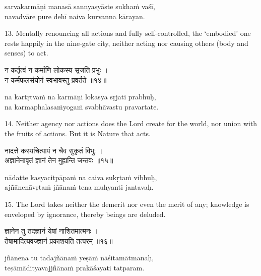 \begin{transliteration}
sarvakarmāṇi manasā sannyasyāste sukhaṁ vaśī, \\
navadvāre pure dehī naiva kurvanna kārayan.
\end{transliteration}

13. Mentally renouncing all actions and fully self-controlled, the `embodied'
one rests happily in the nine-gate city, neither acting nor causing others
(body and senses) to act.

\begin{gitaverse}
न कर्तृत्वं न कर्माणि लोकस्य सृजति प्रभुः । \\
न कर्मफलसंयोगं स्वभावस्तु प्रवर्तते ॥१४॥
\end{gitaverse}

\begin{transliteration}
na kartṛtvaṁ na karmāṇi lokasya sṛjati prabhuḥ, \\
na karmaphalasaṁyogaṁ svabhāvastu pravartate.
\end{transliteration}

14. Neither agency nor actions does the Lord create for the world, nor union
with the fruits of actions. But it is Nature that acts.

\begin{gitaverse}
नादत्ते कस्यचित्पापं न चैव सुकृतं विभुः । \\
अज्ञानेनावृतं ज्ञानं तेन मुह्यन्ति जन्तवः ॥१५॥
\end{gitaverse}

\begin{transliteration}
nādatte kasyacitpāpaṁ na caiva sukṛtaṁ vibhuḥ, \\
ajñānenāvṛtaṁ jñānaṁ tena muhyanti jantavaḥ.
\end{transliteration}

15. The Lord takes neither the demerit nor even the merit of any; knowledge is
enveloped by ignorance, thereby beings are deluded.

\begin{gitaverse}
ज्ञानेन तु तदज्ञानं येषां नाशितमात्मनः । \\
तेषामादित्यवज्ज्ञानं प्रकाशयति तत्परम् ॥१६॥
\end{gitaverse}

\begin{transliteration}
jñānena tu tadajñānaṁ yeṣāṁ nāśitamātmanaḥ, \\
teṣāmādityavajjñānaṁ prakāśayati tatparam.
\end{transliteration}


